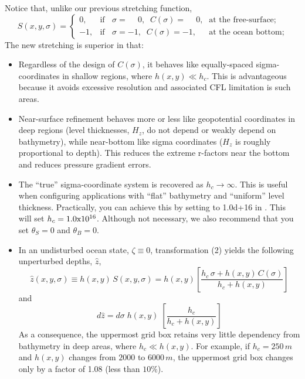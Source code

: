 Notice that, unlike our previous stretching function,
\begin{equation}
  S(x,y,\sigma) = \left\{ \begin{array}{lll}
       0,  &\mbox{if $\;\;\sigma = \phantom{-}0,
 \;\; C(\sigma) = \phantom{-}0$,} & \mbox{at the free-surface;} \\
       -1,  &\mbox{if $\;\;\sigma = -1, \;\;
	    C(\sigma) = -1$,} & \mbox{at the ocean bottom;}
	    \end{array} \right.
\end{equation}
The new stretching is superior in that:
\begin{itemize}
   \item Regardless of the design of $C(\sigma)$, it behaves like
   equally-spaced sigma-coordinates in shallow regions, where
   $h(x,y) \ll h_c$.  This is advantageous because it avoids
   excessive resolution and associated CFL limitation is such areas.

   \item Near-surface refinement behaves more or less like geopotential
   coordinates in deep regions (level thicknesses, $H_z$, do not
   depend or weakly depend on bathymetry), while near-bottom like
   sigma coordinates ($H_z$ is roughly proportional to depth).
   This reduces the extreme r-factors near the bottom and reduces
   pressure gradient errors.

   \item The ``true'' sigma-coordinate system is recovered as $h_c
   \rightarrow \infty$. This is useful when configuring
   applications with ``flat'' bathymetry and ``uniform'' level
   thickness.  Practically, you can achieve this by setting
    to 1.0d+16 in .
   This will set $h_c=1.0\hbox{x}10^{16}$. Although not necessary,
   we also recommend that you set $\theta_S=0$ and
   $\theta_B=0$.

   \item In an undisturbed ocean state, $\zeta\equiv 0$,
   transformation (2) yields the following unperturbed depths, $\hat{z}$,
\begin{equation}
   \hat{z}(x,y,\sigma) \equiv h(x,y) \, S(x,y,\sigma) = h(x,y)
   \left[\frac{h_c \, \sigma + h(x,y)\, C(\sigma)}{h_c +
   h(x,y)}\right]
\end{equation}
   and
\begin{equation}
   d\hat{z} = d\sigma \; h(x,y) \; \left[\frac{h_c}{h_c +
   h(x,y)}\right]
\end{equation}
   As a consequence, the uppermost grid box retains very little
   dependency from bathymetry in deep areas, where $h_c \ll h(x,y)$.
   For example, if $h_c = 250\,m$ and $h(x,y)$ changes from $2000$
   to $6000\,m$, the uppermost grid box changes only by a factor
   of 1.08 (less than $10\%$).
\end{itemize}

